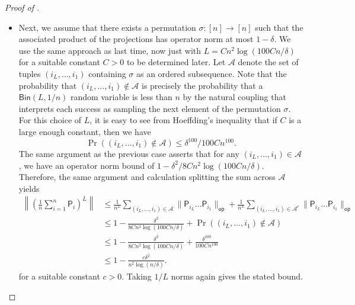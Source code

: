 \documentclass[10pt,a4paper]{amsart}
\begin{document}
\begin{proof}[Proof of ]
\begin{itemize}
        \item Next, we assume that there exists a permutation $\sigma:[n]\to [n]$ such that the associated product of the projections has operator norm at most $1-\delta$. We use the same approach as last time, now just with $L = Cn^2\log(100Cn/\delta)$ for a suitable constant $C>0$ to be determined later. Let $\mathcal{A}$ denote the set of tuples $(i_L,\ldots,i_1)$ containing $\sigma$ as an ordered subsequence. Note that the probability that $(i_L,\ldots,i_1)\not\in \mathcal{A}$ is precisely the probability that a $\mathsf{Bin}(L,1/n)$ random variable is less than $n$ by the natural coupling that interprets each success as sampling the next element of the permutation $\sigma$. For this choice of $L$, it is easy to see from Hoeffding's inequality that if $C$ is a large enough constant, then we have
        \begin{equation*}
            \Pr((i_L,\ldots,i_1)\not\in \mathcal{A})\leq \delta^{100}/100Cn^{100}.
        \end{equation*}
        The same argument as the previous case asserts that for any $(i_L,\ldots,i_1)\in \mathcal{A}$, we have an operator norm bound of $1-\delta^2/8Cn^2\log(100Cn/\delta)$. Therefore, the same argument and calculation splitting the sum across $\mathcal{A}$ yields
        \begin{align*}
            \left\|\left(\frac{1}{n}\sum_{i=1}^n \mathsf{P}_i\right)^L\right\|&\leq \frac{1}{n^L}\sum_{(i_L,\ldots,i_1)\in \mathcal{A}} \|\mathsf{P}_{i_L}\ldots \mathsf{P}_{i_1}\|_{\mathsf{op}}+\frac{1}{n^L}\sum_{(i_L,\ldots,i_1)\in \mathcal{A}^c} \|\mathsf{P}_{i_L}\ldots \mathsf{P}_{i_1}\|_{\mathsf{op}}\\
            &\leq 1-\frac{\delta^2}{8Cn^2\log(100Cn/\delta)}+\Pr((i_L,\ldots,i_1)\not\in \mathcal{A})\\
            &\leq 1-\frac{\delta^2}{8Cn^2\log(100Cn/\delta)}+\frac{\delta^{100}}{100Cn^{100}}\\
            &\leq 1-\frac{c\delta^2}{n^2\log(n/\delta)}.
        \end{align*}
        for a suitable constant $c>0$. Taking $1/L$ norms again gives the stated bound.\qedhere
    \end{itemize}
\end{proof}
\end{document}
